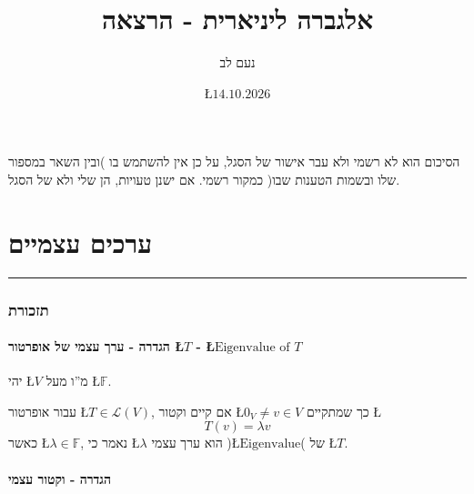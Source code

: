 \documentclass[english,hebrew]{article}
\theoremstyle{plain}
\begin{document}
\title{אלגברה ליניארית {\endL} - הרצאה {\endL}}
\author{נעם לב}
\date{\L{$14.10.2026$}}

\maketitle
\noindent{}
\begin{center}
הסיכום הוא לא רשמי ולא עבר אישור של הסגל, על כן אין להשתמש בו )ובין
השאר במספור שלו ובשמות הטענות שבו( כמקור רשמי. אם ישנן טעויות, הן
שלי ולא של הסגל.
\par\end{center}

\medskip{}

\tableofcontents{}

\newpage{}

\part{ערכים עצמיים}

\rule[0.5ex]{1\columnwidth}{1pt}

\section{תזכורת}

\subsection{הגדרה - ערך עצמי של אופרטור \L{$T$} - \L{$\text{Eigenvalue of }T$}}

יהי \L{$V$} מ\textquotedblright ו מעל \L{$\mathbb{F}$}.

עבור אופרטור \L{$T\in\mathcal{L}(V)$}, אם קיים וקטור \L{$0_{V}\ne v\in V$}
כך שמתקיים \L{%
\[
T(v)=\lambda v
\]
}%
כאשר \L{$\lambda\in\mathbb{F}$}, נאמר כי \L{$\lambda$} הוא ערך עצמי
)\L{$\text{Eigenvalue}$}( של \L{$T$}.

\subsection{הגדרה - וקטור עצמי}
\end{document}
